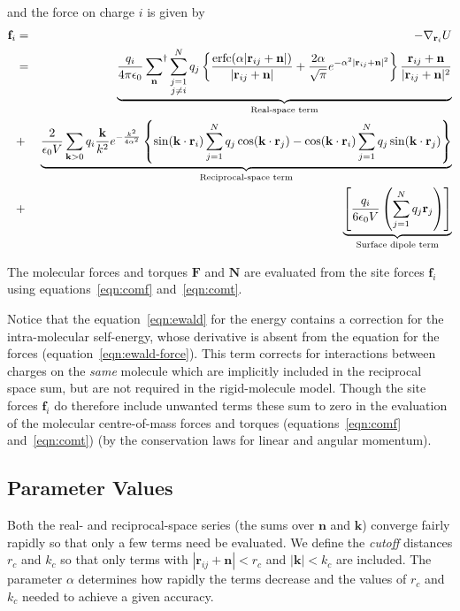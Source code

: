 \documentclass[a4paper,twoside]{report}
\providecommand{\bm}[1]{\mathbf{#1}}
\newcommand{\erfc}{\mbox{erfc}}
\begin{document}
and the force on charge $i$ is given by
\begin{eqnarray}
  \label{eqn:ewald-force}
  \bm{f}_i &=& - \nabla_{\bm{r}_i} U \nonumber \\
  & = & \underbrace{\frac{q_i}{4 \pi \epsilon_0}
    \sideset{}{^\dag}\sum_{\bm{n}} \sum_{\substack{j=1\\j \neq i}}^{N}
    q_j \left \lbrace \frac{\erfc( \alpha | \bm{r}_{ij} + \bm{n} |)}{|
        \bm{r}_{ij} +\bm{n} | } + \frac{2 \alpha}{\sqrt{\pi}}e^{-
        \alpha^2 | \bm{r}_{ij} + \bm{n} |^2} \right \rbrace
    \frac{\bm{r}_{ij} + \bm{n}}{| \bm{r}_{ij} + \bm{n} |^2}
    }_{\textnormal{Real-space term}} \nonumber \\
  & + & \underbrace{\frac{2}{\epsilon_0 V} \sum_{\bm{k} > 0} q_i
    \frac{\bm{k}}{k^2} e^{-\frac{k^2}{4 \alpha^2}} \left \lbrace
      \sin(\bm{k \cdot r}_i) \sum_{j=1}^{N} q_j \cos(\bm{k \cdot r}_j)
      - \cos(\bm{k \cdot r}_i) \sum_{j=1}^{N} q_j \sin(\bm{k \cdot
        r}_j)
    \right \rbrace}_{\textnormal{Reciprocal-space term}}\\
  & + & \underbrace{\left [ \frac{q_i}{6 \epsilon_0 V} \left (
        \sum_{j=1}^N q_j \bm{r}_j \right ) \right
    ]}_{\textnormal{Surface dipole term}} \nonumber
\end{eqnarray}

The molecular forces and torques $\bm{F}$ and $\bm{N}$ are evaluated
from the site forces $\bm{f}_i$ using equations~\ref{eqn:comf} 
and~\ref{eqn:comt}.

Notice that the equation~\ref{eqn:ewald} for the energy contains a
correction for the intra-molecular self-energy, whose derivative is
absent from the equation for the forces
(equation~\ref{eqn:ewald-force}).  This term corrects for interactions
between charges on the \emph{same} molecule which are implicitly
included in the reciprocal space sum, but are not required in the
rigid-molecule model.  Though the site forces $\bm{f}_i$ do therefore
include unwanted terms these sum to zero in the evaluation of the
molecular centre-of-mass forces and torques (equations~\ref{eqn:comf}
and~\ref{eqn:comt}) (by the conservation laws for linear and angular
momentum).

\subsection{Parameter Values}
\label{sec:ewald-auto}

Both the real- and reciprocal-space series (the sums over $\bm{n}$ and
$\bm{k}$) converge fairly rapidly so that only a few terms need be
evaluated.  We define the \emph{cutoff} distances $r_c$ and $k_c$ so
that only terms with $| \bm{r}_{ij} +\bm{n} | < r_c$ and $|\bm{k}| < k_c$
are included.  The parameter $\alpha$ determines how rapidly the terms
decrease and the values of $r_c$ and $k_c$ needed to achieve a given
accuracy. 
\end{document}
